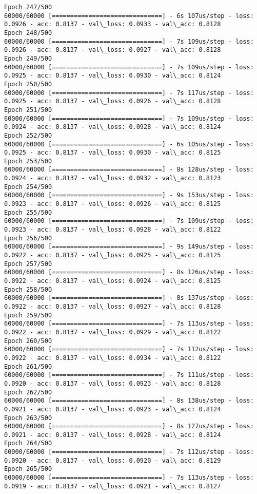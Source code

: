 \documentclass[11pt]{article}
\begin{document}
\begin{Verbatim}[commandchars=\\\{\}]
Epoch 247/500
60000/60000 [==============================] - 6s 107us/step - loss: 0.0926 - acc: 0.8137 - val\_loss: 0.0933 - val\_acc: 0.8128
Epoch 248/500
60000/60000 [==============================] - 7s 109us/step - loss: 0.0926 - acc: 0.8137 - val\_loss: 0.0927 - val\_acc: 0.8128
Epoch 249/500
60000/60000 [==============================] - 7s 109us/step - loss: 0.0925 - acc: 0.8137 - val\_loss: 0.0930 - val\_acc: 0.8124
Epoch 250/500
60000/60000 [==============================] - 7s 117us/step - loss: 0.0925 - acc: 0.8137 - val\_loss: 0.0926 - val\_acc: 0.8128
Epoch 251/500
60000/60000 [==============================] - 7s 109us/step - loss: 0.0924 - acc: 0.8137 - val\_loss: 0.0928 - val\_acc: 0.8124
Epoch 252/500
60000/60000 [==============================] - 6s 105us/step - loss: 0.0925 - acc: 0.8137 - val\_loss: 0.0930 - val\_acc: 0.8125
Epoch 253/500
60000/60000 [==============================] - 8s 128us/step - loss: 0.0924 - acc: 0.8137 - val\_loss: 0.0932 - val\_acc: 0.8123
Epoch 254/500
60000/60000 [==============================] - 9s 153us/step - loss: 0.0923 - acc: 0.8137 - val\_loss: 0.0926 - val\_acc: 0.8125
Epoch 255/500
60000/60000 [==============================] - 7s 109us/step - loss: 0.0923 - acc: 0.8137 - val\_loss: 0.0928 - val\_acc: 0.8122
Epoch 256/500
60000/60000 [==============================] - 9s 149us/step - loss: 0.0922 - acc: 0.8137 - val\_loss: 0.0925 - val\_acc: 0.8125
Epoch 257/500
60000/60000 [==============================] - 8s 126us/step - loss: 0.0922 - acc: 0.8137 - val\_loss: 0.0924 - val\_acc: 0.8125
Epoch 258/500
60000/60000 [==============================] - 8s 137us/step - loss: 0.0922 - acc: 0.8137 - val\_loss: 0.0927 - val\_acc: 0.8128
Epoch 259/500
60000/60000 [==============================] - 7s 113us/step - loss: 0.0922 - acc: 0.8137 - val\_loss: 0.0929 - val\_acc: 0.8122
Epoch 260/500
60000/60000 [==============================] - 7s 112us/step - loss: 0.0922 - acc: 0.8137 - val\_loss: 0.0934 - val\_acc: 0.8122
Epoch 261/500
60000/60000 [==============================] - 7s 111us/step - loss: 0.0920 - acc: 0.8137 - val\_loss: 0.0923 - val\_acc: 0.8128
Epoch 262/500
60000/60000 [==============================] - 8s 138us/step - loss: 0.0921 - acc: 0.8137 - val\_loss: 0.0923 - val\_acc: 0.8124
Epoch 263/500
60000/60000 [==============================] - 8s 127us/step - loss: 0.0921 - acc: 0.8137 - val\_loss: 0.0928 - val\_acc: 0.8124
Epoch 264/500
60000/60000 [==============================] - 7s 112us/step - loss: 0.0920 - acc: 0.8137 - val\_loss: 0.0920 - val\_acc: 0.8129
Epoch 265/500
60000/60000 [==============================] - 7s 113us/step - loss: 0.0919 - acc: 0.8137 - val\_loss: 0.0921 - val\_acc: 0.8127

\end{Verbatim}
\end{document}
